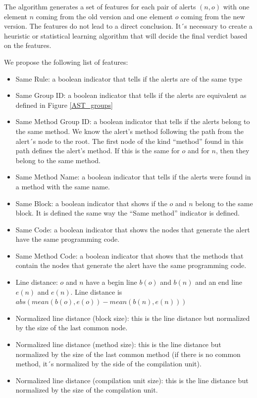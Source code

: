 \documentclass[
]{article}
\begin{document}

The algorithm generates a set of features for each pair of alerts
\((n,o)\) with one element \(n\) coming from the old version and one
element \(o\) coming from the new version. The features do not lead to a
direct conclusion. It´s necessary to create a heuristic or statistical
learning algorithm that will decide the final verdict based on the
features.

We propose the following list of features:

\begin{itemize}
\item
  Same Rule: a boolean indicator that tells if the alerts are of the
  same type
\item
  Same Group ID: a boolean indicator that tells if the alerts are
  equivalent as defined in Figure \ref{AST_groups}
\item
  Same Method Group ID: a boolean indicator that tells if the alerts
  belong to the same method. We know the alert's method following the
  path from the alert´s node to the root. The first node of the kind
  ``method'' found in this path defines the alert's method. If this is
  the same for \(o\) and for \(n\), then they belong to the same method.
\item
  Same Method Name: a boolean indicator that tells if the alerts were
  found in a method with the same name.
\item
  Same Block: a boolean indicator that shows if the \(o\) and \(n\)
  belong to the same block. It is defined the same way the ``Same
  method'' indicator is defined.
\item
  Same Code: a boolean indicator that shows the nodes that generate the
  alert have the same programming code.
\item
  Same Method Code: a boolean indicator that shows that the methods that
  contain the nodes that generate the alert have the same programming
  code.
\item
  Line distance: \(o\) and \(n\) have a begin line \(b(o)\) and \(b(n)\)
  and an end line \(e(n)\) and \(e(n)\). Line distance is
  \(abs(mean(b(o), e(o)) - mean(b(n), e(n)))\)
\item
  Normalized line distance (block size): this is the line distance but
  normalized by the size of the last common node.
\item
  Normalized line distance (method size): this is the line distance but
  normalized by the size of the last common method (if there is no
  common method, it´s normalized by the side of the compilation unit).
\item
  Normalized line distance (compilation unit size): this is the line
  distance but normalized by the size of the compilation unit.
\end{itemize}
\end{document}
